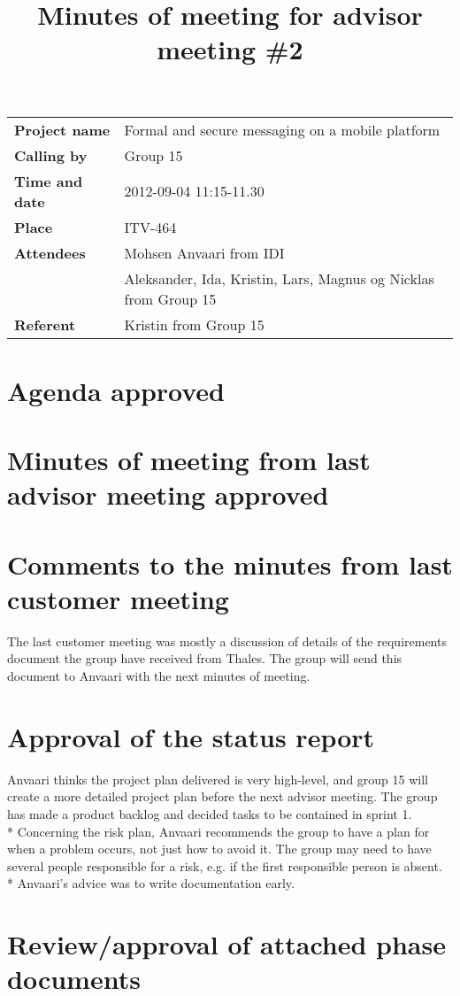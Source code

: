 \documentclass[a4paper,12pt]{article}
\begin{document}
\title{Minutes of meeting for advisor meeting \#2}
\maketitle
\begin{tabular}{>{\bfseries}l l}	
Project name&Formal and secure messaging on a mobile platform\\
Calling by&Group 15\\
Time and date&2012-09-04 11:15-11.30\\
Place&ITV-464\\
Attendees&Mohsen Anvaari from IDI\\
 & Aleksander, Ida, Kristin, Lars, Magnus og Nicklas from Group 15\\
Referent&Kristin from Group 15\\
\end{tabular}
\section{Agenda approved}
\section{Minutes of meeting from last advisor meeting approved}
\section{Comments to the minutes from last customer meeting}
The last customer meeting was mostly a discussion of details of the requirements document the group have received from Thales. The group will send this document to Anvaari with the next minutes of meeting.
\section{Approval of the status report}
Anvaari thinks the project plan delivered is very high-level, and group 15 will create a more detailed project plan before the next advisor meeting. The group has made a product backlog and decided tasks to be contained in sprint 1. \\*
Concerning the risk plan, Anvaari recommends the group to have a plan for when a problem occurs, not just how to avoid it. The group may need to have several people responsible for a risk, e.g. if the first responsible person is absent. \\*
Anvaari's advice was to write documentation early. 
\section{Review/approval of attached phase documents}
\end{document}
